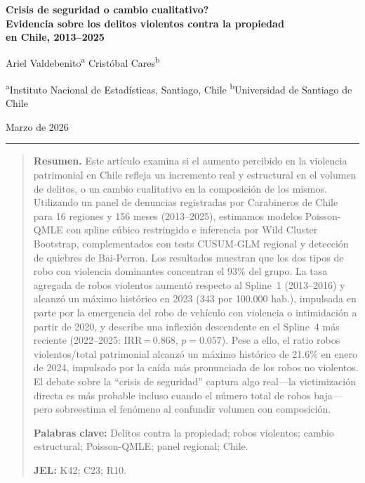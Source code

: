 \documentclass[12pt,a4paper]{article}
\begin{document}

\thispagestyle{plain}

\begin{center}
{\Large\bfseries \textquestiondown Crisis de seguridad o cambio cualitativo?\\[6pt]
Evidencia sobre los delitos violentos contra la propiedad\\[6pt]
en Chile, 2013--2025}

\vspace{18pt}
{\normalsize Ariel Valdebenito\textsuperscript{a} \quad Crist\'obal Cares\textsuperscript{b}}

\vspace{6pt}
{\small \textsuperscript{a}Instituto Nacional de Estad\'isticas, Santiago, Chile \quad
\textsuperscript{b}Universidad de Santiago de Chile}

\vspace{6pt}
{\small Marzo de 2026}
\end{center}

\vspace{12pt}
\noindent\rule{\linewidth}{0.5pt}
\vspace{4pt}

\begin{quote}
\small\noindent\textbf{Resumen.} Este art\'iculo examina si el aumento percibido en la violencia
patrimonial en Chile refleja un incremento real y estructural en el volumen de delitos,
o un cambio cualitativo en la composici\'on de los mismos. Utilizando un panel de
denuncias registradas por Carabineros de Chile para 16 regiones y 156 meses (2013--2025),
estimamos modelos Poisson-QMLE con spline c\'ubico restringido e inferencia por Wild
Cluster Bootstrap, complementados con tests CUSUM-GLM regional y detecci\'on de
quiebres de Bai-Perron. Los resultados muestran que los dos tipos de robo con violencia
dominantes concentran el 93\% del grupo. La tasa agregada de robos violentos aument\'o
respecto al Spline~1 (2013--2016) y alcanz\'o un m\'aximo hist\'orico en 2023
(343 por 100.000 hab.), impulsada en parte por la emergencia del robo de veh\'iculo
con violencia o intimidaci\'on a partir de 2020, y describe una inflexi\'on descendente
en el Spline~4 m\'as reciente (2022--2025: IRR\,=\,0.868, $p=0.057$). Pese a ello, el ratio robos violentos/total patrimonial
alcanz\'o un m\'aximo hist\'orico de 21.6\% en enero de 2024, impulsado por la ca\'ida
m\'as pronunciada de los robos no violentos. El debate sobre la ``crisis de seguridad''
captura algo real---la victimizaci\'on directa es m\'as probable incluso cuando el
n\'umero total de robos baja---pero sobreestima el fen\'omeno al confundir volumen con
composici\'on.

\vspace{6pt}
\noindent\textbf{Palabras clave:} Delitos contra la propiedad; robos violentos; cambio
estructural; Poisson-QMLE; panel regional; Chile.

\noindent\textbf{JEL:} K42; C23; R10.
\end{quote}
\end{document}
